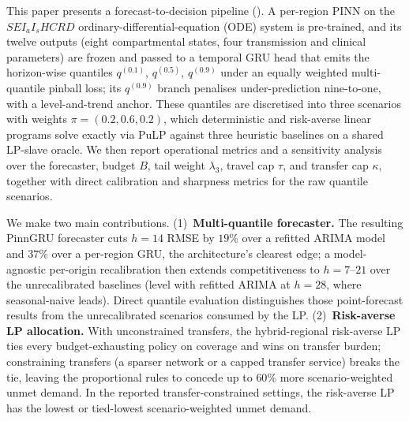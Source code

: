 This paper presents a forecast-to-decision pipeline
(). A per-region PINN on the $SEI_aI_sHCRD$
ordinary-differential-equation (ODE) system is pre-trained, and its
twelve outputs (eight compartmental states, four transmission and
clinical parameters) are frozen and passed to a temporal GRU head that
emits the horizon-wise quantiles $q^{(0.1)}$, $q^{(0.5)}$, $q^{(0.9)}$
under an equally weighted multi-quantile pinball loss; its $q^{(0.9)}$
branch penalises under-prediction nine-to-one, with a level-and-trend
anchor. These
quantiles are discretised into three scenarios with weights
$\pi=(0.2,0.6,0.2)$, which deterministic and risk-averse linear
programs solve exactly via PuLP against three heuristic baselines on a
shared LP-slave oracle. We then report operational metrics and a
sensitivity analysis over the forecaster, budget $B$, tail weight
$\lambda_3$, travel cap $\tau$, and transfer cap $\kappa$, together with
direct calibration and sharpness metrics for the raw quantile scenarios.

We make two main contributions.
(1)~\textbf{Multi-quantile forecaster.} The resulting PinnGRU
forecaster cuts $h{=}14$ RMSE by $19\%$ over a
refitted ARIMA model and $37\%$ over a per-region GRU, the
architecture's clearest edge; a model-agnostic per-origin recalibration
then extends competitiveness to $h{=}7$--$21$ over the unrecalibrated
baselines (level with refitted ARIMA at $h{=}28$, where seasonal-naive
leads). Direct quantile evaluation distinguishes those point-forecast
results from the unrecalibrated scenarios consumed by the LP.
(2)~\textbf{Risk-averse LP allocation.} With unconstrained transfers, the
hybrid-regional risk-averse LP ties every budget-exhausting policy on
coverage and wins on transfer burden; constraining transfers (a sparser network or a
capped transfer service) breaks the tie, leaving the proportional rules
to concede up to $60\%$ more scenario-weighted unmet demand. In the
reported transfer-constrained settings, the risk-averse LP has the
lowest or tied-lowest scenario-weighted unmet demand.
